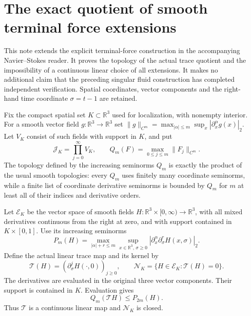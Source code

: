 \documentclass[10pt,a4paper]{article}
\newcounter{none}
\newcommand{\J}{\mathcal J_K}
\newcommand{\E}{\mathcal E_K}
\newcommand{\N}{\mathcal N_K}
\begin{document}
\section{The exact quotient of smooth terminal force extensions}

This note extends the explicit terminal-force construction in the accompanying
Navier--Stokes reader. It proves the topology of the actual trace quotient and
the impossibility of a continuous linear choice of all extensions. It makes no
additional claim that the preceding singular fluid construction has completed
independent verification. Spatial coordinates, vector components and the
right-hand time coordinate $\sigma=t-1$ are retained.

Fix the compact spatial set $K\subset\mathbb R^3$ used for localization,
with nonempty interior. For a smooth vector field $g:\mathbb R^3\to\mathbb R^3$
set $\|g\|_{C^m}=\max_{|\alpha|\le m}\sup_x|\partial_x^\alpha g(x)|_2$.
Let $V_K$ consist of such fields with support in $K$, and put
\[
 \J=\prod_{j=0}^\infty V_K,\qquad
 Q_m(F)=\max_{0\le j\le m}\|F_j\|_{C^m}.
\]
The topology defined by the increasing seminorms $Q_m$ is exactly the product
of the usual smooth topologies: every $Q_m$ uses finitely many coordinate
seminorms, while a finite list of coordinate derivative seminorms is bounded
by $Q_m$ for $m$ at least all of their indices and derivative orders.

Let $\E$ be the vector space of smooth fields
$H:\mathbb R^3\times[0,\infty)\to\mathbb R^3$, with all mixed derivatives
continuous from the right at zero, and with support contained in
$K\times[0,1]$. Use its increasing seminorms
\[
 P_m(H)=\max_{|\alpha|+r\le m}
       \sup_{x\in\mathbb R^3,\,\sigma\ge0}
                  |\partial_x^\alpha\partial_\sigma^rH(x,\sigma)|_2.
\]
Define the actual linear trace map and its kernel by
\[
 \mathcal T(H)=(\partial_\sigma^jH(\cdot,0))_{j\ge0},\qquad
 \N=\{H\in\E:\mathcal T(H)=0\}.
\]
The derivatives are evaluated in the original three vector components.
Their support is contained in $K$. Evaluation gives
\[
 Q_m(\mathcal T H)\le P_{2m}(H).
 \tag{T.1}
\]
Thus $\mathcal T$ is a continuous linear map and $\N$ is closed.
\end{document}
